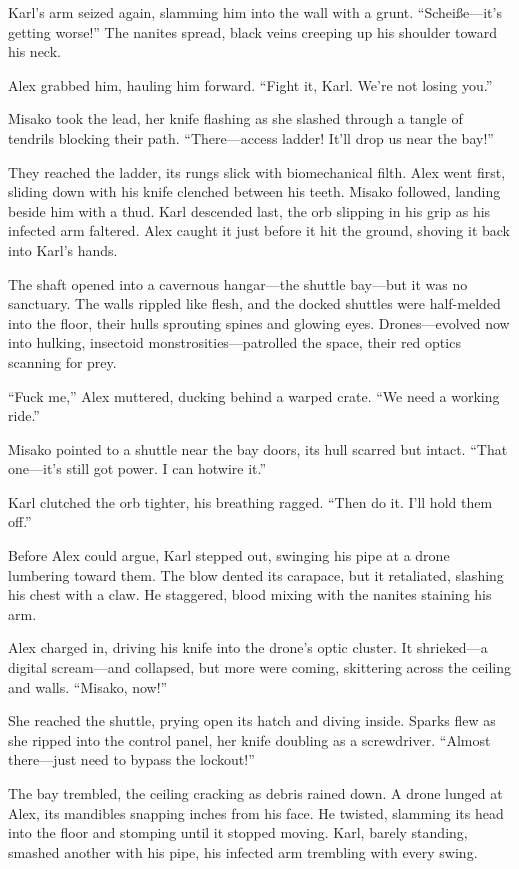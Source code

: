 \documentclass[12pt]{book}
\begin{document}
Karl’s arm seized again, slamming him into the wall with a grunt. “Scheiße—it’s getting worse!” The nanites spread, black veins creeping up his shoulder toward his neck.

Alex grabbed him, hauling him forward. “Fight it, Karl. We’re not losing you.”

Misako took the lead, her knife flashing as she slashed through a tangle of tendrils blocking their path. “There—access ladder! It’ll drop us near the bay!”

They reached the ladder, its rungs slick with biomechanical filth. Alex went first, sliding down with his knife clenched between his teeth. Misako followed, landing beside him with a thud. Karl descended last, the orb slipping in his grip as his infected arm faltered. Alex caught it just before it hit the ground, shoving it back into Karl’s hands.

The shaft opened into a cavernous hangar—the shuttle bay—but it was no sanctuary. The walls rippled like flesh, and the docked shuttles were half-melded into the floor, their hulls sprouting spines and glowing eyes. Drones—evolved now into hulking, insectoid monstrosities—patrolled the space, their red optics scanning for prey.

“Fuck me,” Alex muttered, ducking behind a warped crate. “We need a working ride.”

Misako pointed to a shuttle near the bay doors, its hull scarred but intact. “That one—it’s still got power. I can hotwire it.”

Karl clutched the orb tighter, his breathing ragged. “Then do it. I’ll hold them off.”

Before Alex could argue, Karl stepped out, swinging his pipe at a drone lumbering toward them. The blow dented its carapace, but it retaliated, slashing his chest with a claw. He staggered, blood mixing with the nanites staining his arm.

Alex charged in, driving his knife into the drone’s optic cluster. It shrieked—a digital scream—and collapsed, but more were coming, skittering across the ceiling and walls. “Misako, now!”

She reached the shuttle, prying open its hatch and diving inside. Sparks flew as she ripped into the control panel, her knife doubling as a screwdriver. “Almost there—just need to bypass the lockout!”

The bay trembled, the ceiling cracking as debris rained down. A drone lunged at Alex, its mandibles snapping inches from his face. He twisted, slamming its head into the floor and stomping until it stopped moving. Karl, barely standing, smashed another with his pipe, his infected arm trembling with every swing.
\end{document}

